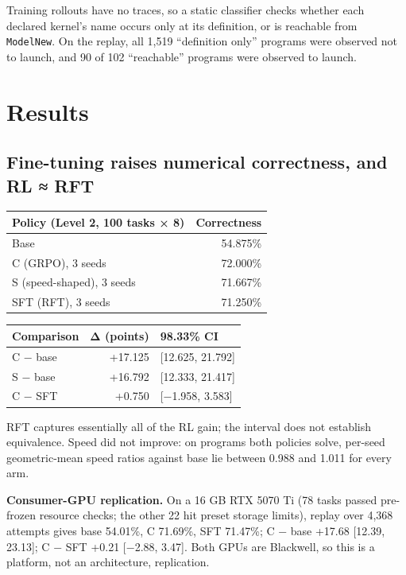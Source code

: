 \documentclass[11pt]{article}
\begin{document}
Training rollouts have no traces, so a static classifier checks whether each declared
kernel's name occurs only at its definition, or is reachable from \texttt{ModelNew}. On the
replay, all 1,519 ``definition only'' programs were observed not to launch, and 90 of
102 ``reachable'' programs were observed to launch.

\section{Results}\label{results}

\subsection{Fine-tuning raises numerical correctness, and RL ≈ RFT}\label{fine-tuning-raises-numerical-correctness-and-rl-rft}

\begin{center}\small
\begin{tabular}{@{}lr@{}}
\toprule\noalign{}
Policy (Level 2, 100 tasks × 8) & Correctness \\
\midrule\noalign{}
Base & 54.875\% \\
C (GRPO), 3 seeds & 72.000\% \\
S (speed-shaped), 3 seeds & 71.667\% \\
SFT (RFT), 3 seeds & 71.250\% \\
\bottomrule
\end{tabular}
\end{center}

\begin{center}\small
\begin{tabular}{@{}lrl@{}}
\toprule\noalign{}
Comparison & Δ (points) & 98.33\% CI \\
\midrule\noalign{}
C − base & +17.125 & {[}12.625, 21.792{]} \\
S − base & +16.792 & {[}12.333, 21.417{]} \\
C − SFT & +0.750 & {[}−1.958, 3.583{]} \\
\bottomrule
\end{tabular}
\end{center}

RFT captures essentially all of the RL gain; the interval does not establish
equivalence. Speed did not improve: on programs both policies solve, per-seed
geometric-mean speed ratios against base lie between 0.988 and 1.011 for every arm.

\textbf{Consumer-GPU replication.} On a 16 GB RTX 5070 Ti (78 tasks passed pre-frozen
resource checks; the other 22 hit preset storage limits), replay over 4,368 attempts
gives base 54.01\%, C 71.69\%, SFT 71.47\%; C − base +17.68 {[}12.39, 23.13{]}; C − SFT +0.21
{[}−2.88, 3.47{]}. Both GPUs are Blackwell, so this is a platform, not an architecture,
replication.
\end{document}
